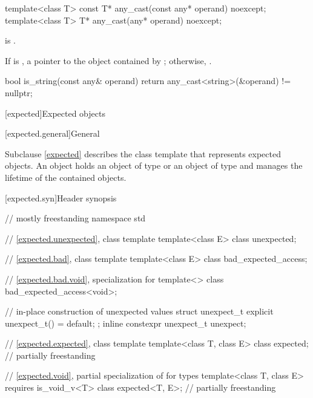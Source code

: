 %
\begin{itemdecl}
template<class T>
  const T* any_cast(const any* operand) noexcept;
template<class T>
  T* any_cast(any* operand) noexcept;
\end{itemdecl}

\begin{itemdescr}
\pnum
\mandates
{} is .

\pnum
\returns
If  is ,
a pointer to the object contained by ;
otherwise, .

\pnum
\begin{example}
\begin{codeblock}
bool is_string(const any& operand) {
  return any_cast<string>(&operand) != nullptr;
}
\end{codeblock}
\end{example}
\end{itemdescr}

[expected]{Expected objects}
%

[expected.general]{General}

\pnum
Subclause \ref{expected} describes the class template 
that represents expected objects.
An  object holds
an object of type  or an object of type  and
manages the lifetime of the contained objects.

[expected.syn]{Header  synopsis}

%
%
%
\begin{codeblock}
// mostly freestanding
namespace std {
  // \ref{expected.unexpected}, class template 
  template<class E> class unexpected;

  // \ref{expected.bad}, class template 
  template<class E> class bad_expected_access;

  // \ref{expected.bad.void}, specialization for 
  template<> class bad_expected_access<void>;

  // in-place construction of unexpected values
  struct unexpect_t {
    explicit unexpect_t() = default;
  };
  inline constexpr unexpect_t unexpect{};

  // \ref{expected.expected}, class template 
  template<class T, class E> class expected;                                // partially freestanding

  // \ref{expected.void}, partial specialization of  for  types
  template<class T, class E> requires is_void_v<T> class expected<T, E>;    // partially freestanding
}
\end{codeblock}

